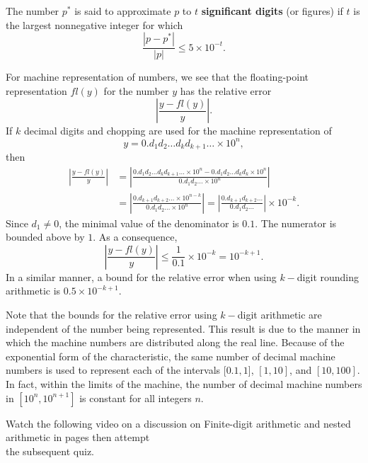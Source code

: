 \begin{definition}
The number $p^*$ is said to approximate $p$ to $t$ {\bf significant digits} (or figures) if $t$ is the largest
 nonnegative integer for which
\[\frac{|p-p^*|}{|p|}\leq5\times10^{-t}.\]
\end{definition}

For machine representation of numbers, we see that the floating-point representation $fl(y)$ for the number $y$ has the relative error
\[\left|\frac{y-fl(y)}{y}\right|.\]
 If $k$ decimal digits and chopping are used for the machine representation of
\[y=0.d_1d_2\ldots d_kd_{k+1}\ldots\times10^n,\]
then
\[\begin{split}
\left|\frac{y-fl(y)}{y}\right|&=\left|\frac{0.d_1d_2\ldots d_kd_{k+1}\ldots\times10^n-0.d_1d_2\ldots d_kd_k\times10^n}{0.d_1d_2\ldots \times10^n}\right|\\[3mm]
&=\left|\frac{0.d_{k+1}d_{k+2}\ldots \times10^{n-k}}{0.d_1d_2\ldots\times10^n}\right|=\left|\frac{0.d_{k+1}d_{k+2}\ldots}{0.d_1d_2\ldots}\right|\times10^{-k}.
\end{split}\]
Since $d_1\neq 0$, the minimal value of the denominator is $0.1$. The numerator is bounded above by $1$. As a consequence,
\[\left|\frac{y-fl(y)}{y}\right|\leq\frac{1}{0.1}\times10^{-k}=10^{-k+1}.\]
 In a similar manner, a bound for the relative error when using $k-$digit rounding arithmetic is $0.5\times10^{-k+1}$.

Note that the bounds for the relative error using $k-$digit arithmetic are independent of the number being represented. This result is due to the manner in which the machine numbers are distributed along the real line. Because of the exponential form of the characteristic, the same number of decimal machine numbers is used to represent each of the intervals $[0.1, 1$], $[1, 10]$, and $[10,100]$. In fact, within the limits of the machine, the number of decimal machine numbers in $[10^n,10^{n+1}]$ is constant for all integers $n$.

\begin{youtube}[]
Watch the following video on  a discussion on Finite-digit arithmetic and nested arithmetic in pages then attempt\\ the subsequent quiz.\\
\end{youtube}

